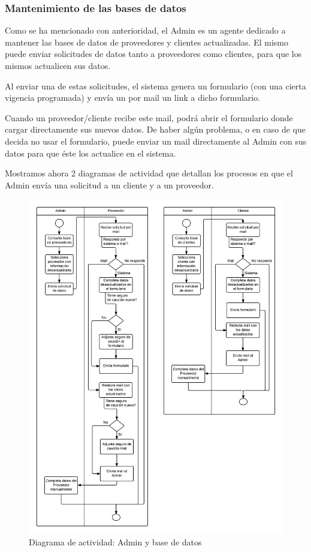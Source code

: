 	\subsubsection{Mantenimiento de las bases de datos}
Como se ha mencionado con anterioridad, el Admin es un agente dedicado 
a mantener las bases de datos de proveedores y clientes actualizadas. 
El mismo puede enviar solicitudes de datos tanto a proveedores como clientes, 
para que los mismos actualicen sus datos. 

Al enviar una de estas solicitudes, 
el sistema genera un formulario (con una cierta vigencia programada) y envía 
un por mail un link a dicho formulario. 

Cuando un proveedor/cliente recibe este mail, podrá abrir el formulario 
donde cargar directamente sus nuevos datos. De haber algún problema, o en caso 
de que decida no usar el formulario, puede enviar un mail directamente al Admin 
con sus datos para que éste los actualice en el sistema. 

Mostramos ahora 2 diagramas de actividad que detallan los procesos en que 
el Admin envía una solicitud a un cliente y a un proveedor. 

\begin{figure}[H]
\centering
\includegraphics[width=0.8\linewidth]{diag/nuevos/da-admin.png}
\caption{Diagrama de actividad: Admin y base de datos}
\label{da-admin}
\end{figure}
